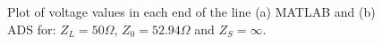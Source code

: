 \begin{figure}[H]
\begin{center}
\end{center}
\caption{Plot of voltage values in each end of the line (a) MATLAB and (b) ADS for: $Z_L = 50 \Omega$, $Z_0 = 52.94 \Omega$ and $Z_S = \infty$.}
\label{plot:voltages52} 
\end{figure}